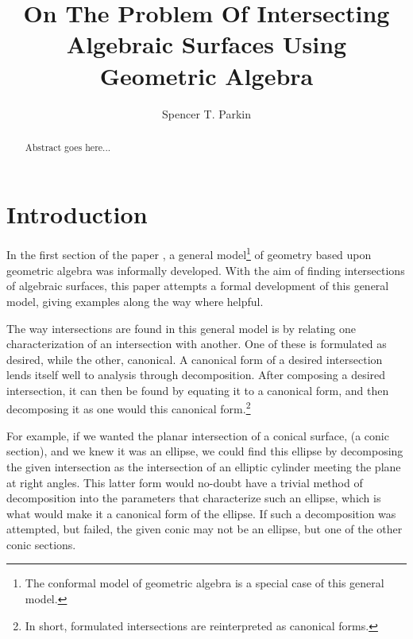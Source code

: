 \documentclass{birkjour}
\theoremstyle{definition}
\theoremstyle{remark}
\numberwithin{equation}{section}
\begin{document}
\title{On The Problem Of Intersecting\\Algebraic Surfaces Using\\Geometric Algebra}

\author{Spencer T. Parkin}
\address{102 W. 500 S., \\
Salt Lake City, UT  84101} 



\begin{abstract}
Abstract goes here...
\end{abstract}


\maketitle

\section{Introduction}

In the first section of the paper \cite{}, a general model\footnote{The conformal model of geometric algebra
is a special case of this general model.} of geometry based upon geometric algebra
was informally developed.  With the aim of finding intersections of algebraic surfaces,
this paper attempts a formal development of this general model, giving examples along the way where helpful.

The way intersections are found in this general model is by relating one characterization of an intersection
with another.  One of these is formulated as desired, while the other, canonical.  A canonical form of a desired intersection
lends itself well to analysis through decomposition.  After composing a desired intersection, it can then be found
by equating it to a canonical form, and then decomposing it as one would this canonical form.\footnote{In short,
formulated intersections are reinterpreted as canonical forms.}

For example, if we wanted
the planar intersection of a conical surface, (a conic section), and we knew it was an ellipse, we could find
this ellipse by decomposing the given intersection as the intersection of an elliptic cylinder meeting the plane
at right angles.  This latter form would no-doubt have a trivial method of decomposition into the parameters
that characterize such an ellipse, which is what would make it a canonical form of the ellipse.
If such a decomposition was attempted, but failed, the given conic may not be an ellipse, but one of
the other conic sections.
\end{document}
